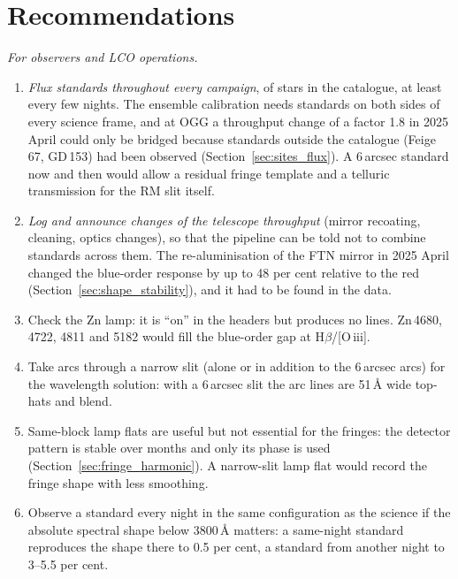 \chapter{Recommendations}
\label{sec:recommendations}

\textit{For observers and LCO operations.}
\begin{enumerate}
\item \textit{Flux standards throughout every campaign}, of stars in the \banzai{} catalogue, at least every few nights.
The ensemble calibration needs standards on both sides of every science frame, and at OGG a throughput change of a
factor 1.8 in 2025 April could only be bridged because standards outside the catalogue (Feige\,67, GD\,153) had been
observed (Section~\ref{sec:sites_flux}). A 6\,arcsec standard now and then would allow a residual fringe template and
a telluric transmission for the RM slit itself.
\item \textit{Log and announce changes of the telescope throughput} (mirror recoating, cleaning, optics changes), so that the
pipeline can be told not to combine standards across them. The re-aluminisation of the FTN mirror in 2025 April
changed the blue-order response by up to 48 per cent relative to the red (Section~\ref{sec:shape_stability}), and it
had to be found in the data.
\item Check the Zn lamp: it is ``on'' in the headers but produces no lines. Zn\,4680, 4722, 4811 and 5182 would fill
the blue-order gap at H$\beta$/[O\,{\sc iii}].
\item Take arcs through a narrow slit (alone or in addition to the 6\,arcsec arcs) for the wavelength solution:
with a 6\,arcsec slit the arc lines are 51\,\AA{} wide top-hats and blend.
\item Same-block lamp flats are useful but not essential for the fringes: the detector pattern is stable over months
and only its phase is used (Section~\ref{sec:fringe_harmonic}). A narrow-slit lamp flat would record the fringe
shape with less smoothing.
\item Observe a standard every night in the same configuration as the science if the absolute spectral shape below
3800\,\AA{} matters: a same-night standard reproduces the shape there to 0.5 per cent, a standard from another night
to 3--5.5 per cent.
\end{enumerate}

